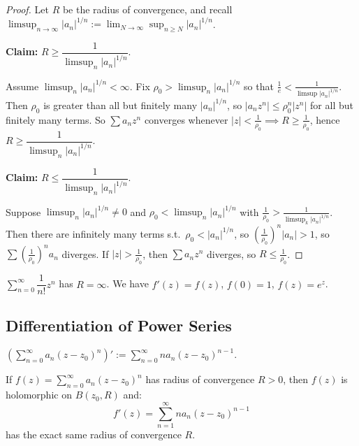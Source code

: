 \documentclass[11pt]{article}
\begin{document}
\begin{proof}
Let $R$ be the radius of convergence, and recall $\limsup_{n\to\infty} |a_n|^{1/n} := \lim_{N\to\infty}\sup_{n\ge N} |a_n|^{1/n}$.

\textbf{Claim:} $R \ge \dfrac{1}{\limsup_n |a_n|^{1/n}}$.

Assume $\limsup_n |a_n|^{1/n} < \infty$. Fix $\rho_0 > \limsup_n |a_n|^{1/n}$ so that $\frac{1}{e} < \frac{1}{\limsup |a_n|^{1/n}}$. Then $\rho_0$ is greater than all but finitely many $|a_n|^{1/n}$, so $|a_nz^n| \le \rho_0^n |z^n|$ for all but finitely many terms. So $\sum a_nz^n$ converges whenever $|z| < \frac{1}{\rho_0} \implies R \ge \frac{1}{\rho_0}$, hence $R \ge \dfrac{1}{\limsup_n |a_n|^{1/n}}$.

\textbf{Claim:} $R \le \dfrac{1}{\limsup_n |a_n|^{1/n}}$.

Suppose $\limsup_n |a_n|^{1/n} \ne 0$ and $\rho_0 < \limsup_n |a_n|^{1/n}$ with $\frac{1}{\rho_0} > \frac{1}{\limsup_k |a_n|^{1/n}}$. Then there are infinitely many terms s.t.\ $\rho_0 < |a_n|^{1/n}$, so $\left(\frac{1}{\rho_0}\right)^n |a_n| > 1$, so $\sum \left(\frac{1}{\rho_0}\right)^n a_n$ diverges. If $|z| > \frac{1}{\rho_0}$, then $\sum a_nz^n$ diverges, so $R \le \frac{1}{\rho_0}$.
\end{proof}

\begin{example}
$\sum_{n=0}^\infty \dfrac{1}{n!}z^n$ has $R = \infty$. We have $f'(z) = f(z)$, $f(0)=1$, $f(z) = e^z$.
\end{example}

\subsection{Differentiation of Power Series}

\begin{definition}
$\left(\sum_{n=0}^\infty a_n(z-z_0)^n\right)' := \sum_{n=0}^\infty na_n(z-z_0)^{n-1}$.
\end{definition}

\begin{theorem}
If $f(z) = \sum_{n=0}^\infty a_n (z-z_0)^n$ has radius of convergence $R > 0$, then $f(z)$ is holomorphic on $B(z_0, R)$ and:
\[
f'(z) = \sum_{n=1}^\infty n a_n (z-z_0)^{n-1}
\]
has the exact same radius of convergence $R$.
\end{theorem}
\end{document}
